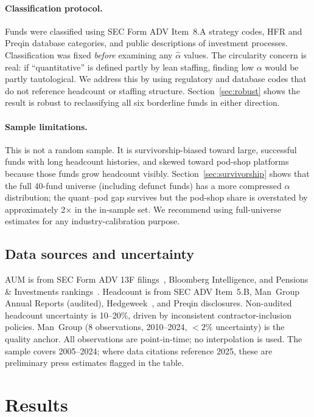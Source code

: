 \documentclass[10pt,onecolumn]{article}
\newcommand{\alphahat}{\hat{\alpha}}
\begin{document}
\paragraph{Classification protocol.}
Funds were classified using SEC Form ADV Item~8.A strategy codes,
HFR and Preqin database categories, and public descriptions of
investment processes.
Classification was fixed \emph{before} examining any $\alphahat$
values.
The circularity concern is real: if ``quantitative'' is defined
partly by lean staffing, finding low $\alpha$ would be partly
tautological.
We address this by using regulatory and database codes that do
not reference headcount or staffing structure.
Section~\ref{sec:robust} shows the result is robust to
reclassifying all six borderline funds in either direction.

\paragraph{Sample limitations.}
This is not a random sample.
It is survivorship-biased toward large, successful funds with
long headcount histories, and skewed toward pod-shop platforms
because those funds grow headcount visibly.
Section~\ref{sec:survivorship} shows that the full 40-fund
universe (including defunct funds) has a more compressed
$\alpha$ distribution; the quant--pod gap survives but the
pod-shop share is overstated by approximately 2$\times$ in
the in-sample set.
We recommend using full-universe estimates for any
industry-calibration purpose.

\subsection{Data sources and uncertainty}

AUM is from SEC Form ADV 13F filings~\cite{sec_adv}, Bloomberg
Intelligence, and Pensions \& Investments rankings~\cite{pandi2024}.
Headcount is from SEC ADV Item~5.B, Man~Group Annual Reports
(audited), Hedgeweek~\cite{hedgeweek2024}, and Preqin disclosures.
Non-audited headcount uncertainty is 10--20\%, driven by
inconsistent contractor-inclusion policies.
Man~Group (8 observations, 2010--2024, $<2\%$ uncertainty) is
the quality anchor.
All observations are point-in-time; no interpolation is used.
The sample covers 2005--2024; where data citations reference
2025, these are preliminary press estimates flagged in the table.


\section{\label{sec:results}Results}
\end{document}
